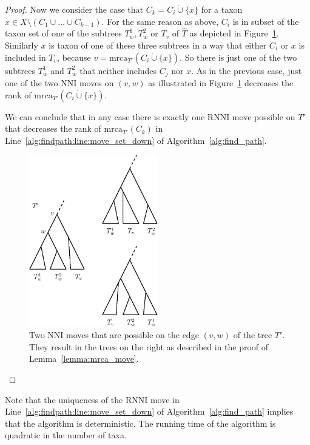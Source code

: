 \documentclass{amsart}
\newcommand{\mrca}{\mathrm{mrca}}
\newcommand{\nni}{\mathrm{NNI}}
\newcommand{\rnni}{\mathrm{RNNI}}
\begin{document}
\begin{proof}
Now we consider the case that $C_k = C_i \dot\cup \{x\}$ for a taxon $x \in X \setminus (C_1 \cup \ldots \cup C_{k-1})$.
For the same reason as above, $C_i$ is in subset of the taxon set of one of the subtrees $T_w^1, T_w^2$ or $T_v$ of $\hat T$ as depicted in Figure~\ref{fig:mrca_move}.
Similarly $x$ is taxon of one of these three subtrees in a way that either $C_i$ or $x$ is included in $T_v$, because $v = \mrca_{T'}(C_i \dot \cup \{x\})$.
So there is just one of the two subtrees $T_w^1$ and $T_w^2$ that neither includes $C_j$ nor $x$.
As in the previous case, just one of the two $\nni$ moves on $(v,w)$ as illustrated in Figure~\ref{fig:mrca_move} decreases the rank of $\mrca_{T'}(C_i \dot \cup \{x\})$.

We can conclude that in any case there is exactly one $\rnni$ move possible on $T'$ that decreases the rank of $\mrca_{T'}(C_k)$ in Line~\ref{alg:findpath:line:move_set_down} of Algorithm~\ref{alg:find_path}.

\begin{figure}[H]
\centering
\includegraphics[width=0.5\textwidth]{mrca_move}
\vspace{12pt}
\caption{Two $\nni$ moves that are possible on the edge $(v,w)$ of the tree $T'$.
They result in the trees on the right as described in the proof of Lemma~\ref{lemma:mrca_move}.}
\label{fig:mrca_move}
\end{figure}

\end{proof}

Note that the uniqueness of the $\rnni$ move in Line~\ref{alg:findpath:line:move_set_down} of Algorithm~\ref{alg:find_path} implies that the algorithm is deterministic.
The running time of the algorithm is quadratic in the number of taxa.
\end{document}
